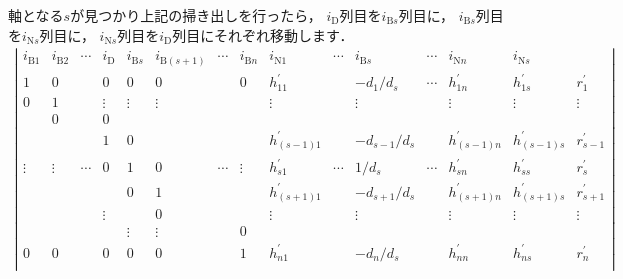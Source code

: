 \documentclass[a4paper]{jsarticle}
\begin{document}
軸となる$s$が見つかり上記の掃き出しを行ったら，
$i_{\mathrm{D}}$列目を$i_{\mathrm{B}s}$列目に，
$i_{\mathrm{B}s}$列目を$i_{\mathrm{N}s}$列目に，
$i_{\mathrm{N}s}$列目を$i_{\mathrm{D}}$列目にそれぞれ移動します．
\begin{align*}
\left|\begin{array}{c|c|c|c|c|c|c|c|c|c|c|c|c|c|c}
i_{\mathrm{B}1} & i_{\mathrm{B}2} & \cdots & i_{\mathrm{D}} & i_{\mathrm{B}s} & i_{\mathrm{B}(s+1)} & \cdots & i_{\mathrm{B}n} & i_{\mathrm{N}1} & \cdots & i_{\mathrm{B}s} & \cdots & i_{\mathrm{N}n} & i_{\mathrm{N}s} & \\
\hline
1      & 0      &        & 0      & 0           & 0      &        & 0      & h_{11}^{\prime}    &        &-d_{1}/d_{s}    & \cdots & h_{1n}^{\prime} & h_{1s}^{\prime}  & r_{1}^{\prime} \\
0      & 1      &        & \vdots & \vdots      & \vdots &        &        & \vdots          &        & \vdots          &        & \vdots          & \vdots & \vdots \\
       & 0      &        & 0      &             &        &        &        &                 &        &                 &        &                 &        &        \\
       &        &        & 1      & 0           &        &        &        & h_{(s-1)1}^{\prime} &        &-d_{s-1}/d_{s}     &        & h_{(s-1)n}^{\prime} & h_{(s-1)s}^{\prime} & r_{s-1}^{\prime} \\
\vdots & \vdots & \cdots & 0      & 1      & 0      & \cdots & \vdots & h_{s1}^{\prime}    & \cdots & 1/d_{s}   & \cdots & h_{sn}^{\prime}    & h_{ss}^{\prime}     & r_{s}^{\prime} \\
       &        &        &        & 0 & 1      &        &        & h_{(s+1)1}^{\prime} &        &-d_{s+1}/d_{s} &        & h_{(s+1)n}^{\prime} & h_{(s+1)s}^{\prime}     & r_{s+1}^{\prime} \\
       &        &        & \vdots &             & 0      &        &        & \vdots          &        & \vdots          &        & \vdots          & \vdots & \vdots \\
       &        &        &        & \vdots      & \vdots &        & 0      &                 &        &                 &        &                 &        &        \\
0      & 0      &        & 0      & 0  & 0      &        & 1      & h_{n1}^{\prime}    &        &-d_{n}/d_{s}   &        & h_{nn}^{\prime}    & h_{ns}^{\prime}   & r_{n}^{\prime} \\
\end{array}\right|
\end{align*}
\end{document}
